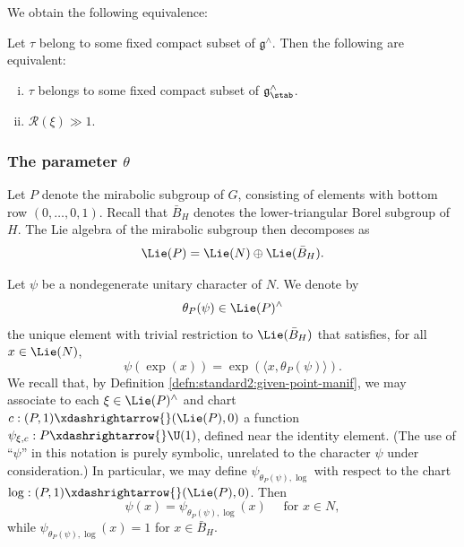 We obtain the following equivalence:
\begin{lemma}\label{lem:standard2:stability-vs-resultant}
  Let $\tau$ belong to some fixed compact subset of $\mathfrak{g}^\wedge$.  Then the following are equivalent:
  \begin{enumerate}[(i)]
  \item $\tau$ belongs to some fixed compact subset of $\mathfrak{g}^\wedge_{\stab}$.
  \item $\mathcal{R}(\xi) \gg 1$.
  \end{enumerate}
\end{lemma}

\subsubsection{The parameter $\theta$}\label{sec:parameter-theta}
Let $P$ denote the mirabolic subgroup of $G$, consisting of elements with bottom row $(0,\dotsc,0,1)$.  Recall that $\bar{B}_H$ denotes the lower-triangular Borel subgroup of $H$.  The Lie algebra of the mirabolic subgroup then decomposes as
\begin{equation*}
  \Lie(P) = \Lie(N) \oplus \Lie(\bar{B}_H).
\end{equation*}

Let $\psi$ be a nondegenerate unitary character of $N$.  We denote by 
\begin{equation*}
  \theta_P(\psi)  \in \Lie(P)^\wedge
\end{equation*}
the unique element with trivial restriction to $\Lie(\bar{B}_H)$ that satisfies, for all $x \in \Lie(N)$,
\begin{equation*}
  \psi(\exp(x)) = \exp (\langle x, \theta_P(\psi)  \rangle).
\end{equation*}
We recall that, by Definition \ref{defn:standard2:given-point-manif}, we may associate to each $\xi \in \Lie(P)^\wedge$ and chart $c : (P,1) \xdashrightarrow{} (\Lie(P),0)$ a function $\psi_{\xi, c} : P \xdashrightarrow{} \U(1)$, defined near the identity element.  (The use of ``$\psi$'' in this notation is purely symbolic, unrelated to the character $\psi$ under consideration.)  In particular, we may define $\psi_{\theta_P(\psi),\log}$  with respect to the chart $\log :  (P, 1) \xdashrightarrow{} (\Lie(P), 0)$.  Then
\begin{equation*}
  \psi(x) = \psi_{\theta_P(\psi), \log}(x) \quad \text{ for } x \in N,
\end{equation*}
while $\psi_{\theta_P(\psi), \log}(x) = 1$ for $x \in \bar{B}_H$.


